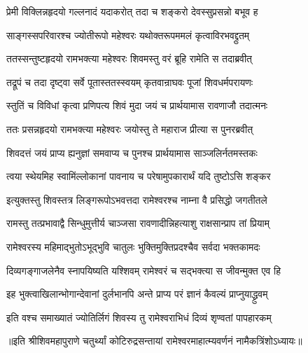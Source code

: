 \twolineshloka
{प्रेमी विक्लिन्नहृदयो गल्लनादं यदाकरोत्} 
{तदा च शङ्करो देवस्सुप्रसन्नो बभूव ह} %

\twolineshloka
{साङ्गस्सपरिवारश्च ज्योतीरूपो महेश्वरः}
{यथोक्तरूपममलं कृत्वाविरभवद्द्रुतम्} %

\twolineshloka
{ततस्सन्तुष्टहृदयो रामभक्त्या महेश्वरः} 
{शिवमस्तु वरं ब्रूहि रामेति स तदाब्रवीत्} %

\twolineshloka
{तद्रूपं च तदा दृष्ट्वा सर्वे पूतास्ततस्स्वयम्} 
{कृतवान्राघवः पूजां शिवधर्मपरायणः} %

\twolineshloka
{स्तुतिं च विविधां कृत्वा प्रणिपत्य शिवं मुदा} 
{जयं च प्रार्थयामास रावणाजौ तदात्मनः} %

\twolineshloka
{ततः प्रसन्नहृदयो रामभक्त्या महेश्वरः} 
{जयोस्तु ते महाराज प्रीत्या स पुनरब्रवीत्} %

\twolineshloka
{शिवदत्तं जयं प्राप्य ह्यनुज्ञां समवाप्य च} 
{पुनश्च प्रार्थयामास साञ्जलिर्नतमस्तकः} %


\twolineshloka
{त्वया स्थेयमिह स्वामिंल्लोकानां पावनाय च} 
{परेषामुपकारार्थं यदि तुष्टोऽसि शङ्कर} %


\twolineshloka
{इत्युक्तस्तु शिवस्तत्र लिङ्गरूपोऽभवत्तदा} 
{रामेश्वरश्च नाम्ना वै प्रसिद्धो जगतीतले} %

\twolineshloka
{रामस्तु तत्प्रभावाद्वै सिन्धुमुत्तीर्य चाञ्जसा}
{रावणादीन्निहत्याशु राक्षसान्प्राप तां प्रियाम्} %

\twolineshloka
{रामेश्वरस्य महिमाद्भुतोऽभूद्भुवि चातुलः} 
{भुक्तिमुक्तिप्रदश्चैव सर्वदा भक्तकामदः} %

\twolineshloka
{दिव्यगङ्गाजलेनैव स्नापयिष्यति यश्शिवम्} 
{रामेश्वरं च सद्भक्त्या स जीवन्मुक्त एव हि} %

\twolineshloka
{इह भुक्त्वाखिलान्भोगान्देवानां दुर्लभानपि} 
{अन्ते प्राप्य परं ज्ञानं कैवल्यं प्राप्नुयाद्ध्रुवम्} %

\twolineshloka
{इति वश्च समाख्यातं ज्योतिर्लिगं शिवस्य तु}
{रामेश्वराभिधं दिव्यं शृण्वतां पापहारकम्} %

॥इति श्रीशिवमहापुराणे चतुर्थ्यां कोटिरुद्रसन्तायां रामेश्वरमाहात्म्यवर्णनं नामैकत्रिंशोऽध्यायः॥
